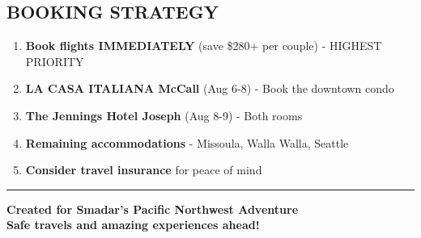 \documentclass[
  10pt,
]{article}
\providecommand{\tightlist}{%
  \setlength{\itemsep}{0pt}\setlength{\parskip}{0pt}}
\begin{document}
\subsection{\texorpdfstring{\textcolor{secondary}{BOOKING STRATEGY}}{}}\label{section-58}

\begin{enumerate}
\def\labelenumi{\arabic{enumi}.}
\tightlist
\item
  \textbf{\textcolor{primary}{Book flights IMMEDIATELY}} (save \$280+
  per couple) - HIGHEST PRIORITY
\item
  \textbf{\textcolor{primary}{LA CASA ITALIANA McCall}} (Aug 6-8) - Book
  the downtown condo\\
\item
  \textbf{\textcolor{primary}{The Jennings Hotel Joseph}} (Aug 8-9) -
  Both rooms\\
\item
  \textbf{\textcolor{primary}{Remaining accommodations}} - Missoula,
  Walla Walla, Seattle\\
\item
  \textbf{\textcolor{primary}{Consider travel insurance}} for peace of
  mind
\end{enumerate}

\begin{center}\rule{0.5\linewidth}{0.5pt}\end{center}

\textbf{\textcolor{primary}{Created for Smadar's Pacific Northwest Adventure}}\\
\textbf{\textcolor{secondary}{Safe travels and amazing experiences ahead!}}
\end{document}
